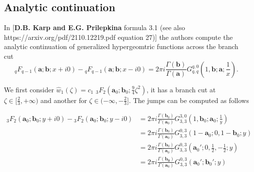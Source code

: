 \documentclass{article}
\begin{document}
%
%


\subsection{Analytic continuation}

In [\textbf{D.B. Karp and E.G. Prilepkina} formula 3.1 (see also \textsf{https://arxiv.org/pdf/2110.12219.pdf} equation 27)] the authors compute the analytic continuation of generalized hypergeomtric functions across the branch cut
\begin{equation}
{}_qF_{q-1}\left(\mathbf{a};\mathbf{b};x+i0\right)-{}_qF_{q-1}\left(\mathbf{a};\mathbf{b};x-i0\right)=2\pi i\frac{\Gamma(\mathbf{b})}{\Gamma(\mathbf{a})}G_{q,q}^{q,0}\left(1,\mathbf{b};\mathbf{a};\frac{1}{x}\right).
\end{equation}

We first consider $\hat{w}_1(\zeta)=c_1\,\, {}_3F_2\left(\mathbf{a}_0;\mathbf{b}_0;\tfrac{9}{4}\zeta^2\right)$, it has a branch cut at $\zeta\in [\tfrac{2}{3},+\infty)$ and another for $\zeta\in (-\infty,-\tfrac{2}{3}]$. The jumps can be computed as follows 

\begin{align*}
{}_3F_2\left(\mathbf{a}_0;\mathbf{b}_0;y+i0\right)-{}_3F_2\left(\mathbf{a}_0;\mathbf{b}_0;y-i0\right)&=2\pi i\frac{\Gamma(\mathbf{b}_0)}{\Gamma(\mathbf{a}_0)}G_{3,3}^{3,0}\left(1,\mathbf{b}_0;\mathbf{a}_0;\frac{1}{y}\right)\\
&=2\pi i \frac{\Gamma(\mathbf{b}_0)}{\Gamma(\mathbf{a}_0)}G_{3,3}^{0,3}\left(1-\mathbf{a}_0;0,1-\mathbf{b}_0;y\right)\\
&=2\pi i \frac{\Gamma(\mathbf{b}_0)}{\Gamma(\mathbf{a}_0)}G_{3,3}^{0,3}\left(\mathbf{a}_0';0,\frac{1}{2},-\frac{1}{2};y\right)\\
&=2\pi i \frac{\Gamma(\mathbf{b_0})}{\Gamma(\mathbf{a}_0)}G_{3,3}^{0,3}\left(\mathbf{a}_0';\mathbf{b}_0';y\right)
\end{align*}
\end{document}
